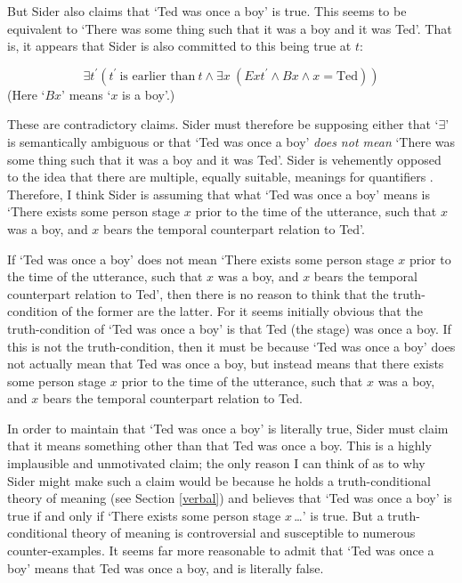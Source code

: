 \documentclass[11pt]{article}
\begin{document}
\begin{spacing}{1.5}
But Sider also claims that `Ted was once a boy' is true.  This seems
to be equivalent to `There was some thing such that it was a boy and
it was Ted'.  That is, it appears that Sider is also committed to this
being true at $t$:

\begin{displaymath}
\exists t^{\prime} (t^{\prime}\ \text{is earlier than}\ t \wedge
\exists x\ (Ext^{\prime} \wedge Bx \wedge x = \text{Ted}))
\end{displaymath}
(Here `$Bx$' means `$x$ is a boy'.)

These are contradictory claims.  Sider must therefore be supposing
either that `$\exists$' is semantically ambiguous or that `Ted was
once a boy' {\em does not mean} `There was some thing such that it was
a boy and it was Ted'.  Sider is vehemently opposed to the idea that
there are multiple, equally suitable, meanings for quantifiers
\citeyearpar{sider2001,sider2011b,sider2011d}.  Therefore, I think
Sider is assuming that what `Ted was once a boy' means is `There
exists some person stage $x$ prior to the time of the utterance, such
that $x$ was a boy, and $x$ bears the temporal counterpart relation to
Ted'.

If `Ted was once a boy' does not mean `There exists some person stage
$x$ prior to the time of the utterance, such that $x$ was a boy, and
$x$ bears the temporal counterpart relation to Ted', then there is no
reason to think that the truth-condition of the former are the latter.
For it seems initially obvious that the truth-condition of `Ted was
once a boy' is that Ted (the stage) was once a boy.  If this is not
the truth-condition, then it must be because `Ted was once a boy' does
not actually mean that Ted was once a boy, but instead means that
there exists some person stage $x$ prior to the time of the utterance,
such that $x$ was a boy, and $x$ bears the temporal counterpart
relation to Ted.

In order to maintain that `Ted was once a boy' is literally true,
Sider must claim that it means something other than that Ted was once
a boy.  This is a highly implausible and unmotivated claim; the only
reason I can think of as to why Sider might make such a claim would be
because he holds a truth-conditional theory of meaning (see Section
\ref{verbal}) and believes that `Ted was once a boy' is true if and
only if `There exists some person stage $x$\,\ldots ' is true.  But a
truth-conditional theory of meaning is controversial and susceptible
to numerous counter-examples.  It seems far more reasonable to admit
that `Ted was once a boy' means that Ted was once a boy, and is
literally false.


\end{spacing}
\end{document}
